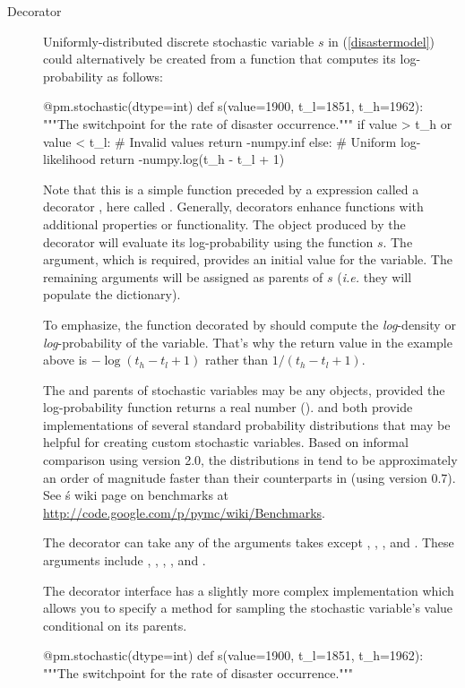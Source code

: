 \documentclass[]{jss}
\begin{document}
\begin{description}
    \item[Decorator] Uniformly-distributed discrete stochastic variable $s$ in (\ref{disastermodel}) could alternatively be created from a function that computes its log-probability as follows:
\begin{CodeInput}
@pm.stochastic(dtype=int)
def s(value=1900, t_l=1851, t_h=1962):
"""The switchpoint for the rate of disaster occurrence."""
if value > t_h or value < t_l:
    # Invalid values
    return -numpy.inf
else:
    # Uniform log-likelihood
    return -numpy.log(t_h - t_l + 1)
\end{CodeInput}
Note that this is a simple  function preceded by a  expression called a decorator \citep{python}, here called . Generally, decorators enhance functions with additional properties or functionality. The  object produced by the  decorator will evaluate its log-probability using the function $s$. The  argument, which is required, provides an initial value for the variable. The remaining arguments will be assigned as parents of $s$ (\emph{i.e.} they will populate the  dictionary).

To emphasize, the  function decorated by  should compute the \emph{log}-density or \emph{log}-probability of the variable. That's why the return value in the example above is $-\log(t_h-t_l+1)$ rather than $1/(t_h-t_l+1)$.

The  and parents of stochastic variables may be any objects, provided the log-probability function returns a real number ().  and  both provide implementations of several standard probability distributions that may be helpful for creating custom stochastic variables. Based on informal comparison using version 2.0, the distributions in  tend to be approximately an order of magnitude faster than their counterparts in  (using version 0.7). See \'s wiki page on benchmarks at \href{http://code.google.com/p/pymc/wiki/Benchmarks}{http://code.google.com/p/pymc/wiki/Benchmarks}.

    The decorator  can take any of the arguments  takes except , , ,  and . These arguments include , , , ,  and .

    The decorator interface has a slightly more complex implementation which allows you to specify a  method for sampling the stochastic variable's value conditional on its parents.
    \begin{CodeInput}
@pm.stochastic(dtype=int)
def s(value=1900, t_l=1851, t_h=1962):
"""The switchpoint for the rate of disaster occurrence."""


\end{CodeInput}
\end{description}
\end{document}
